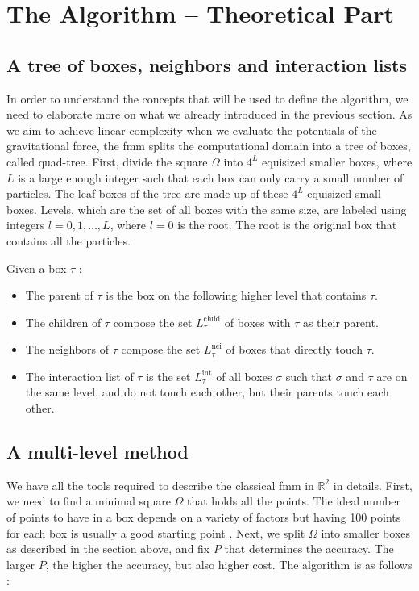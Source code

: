 \section{The Algorithm -- Theoretical Part} \label{algorithm-theory}

\subsection{A tree of boxes, neighbors and interaction lists}

In order to understand the concepts that will be used to define the algorithm, we need to elaborate more on what we already introduced in the previous section.
As we aim to achieve linear complexity when we evaluate the potentials of the gravitational force, the \gls{fmm} splits the computational domain into a tree of boxes, called quad-tree.
First, divide the square $\Omega$ into $4^L$ equisized smaller boxes, where $L$ is a large enough integer such that each box can only carry a small number of particles.
The leaf boxes of the tree are made up of these $4^L$ equisized small boxes.
Levels, which are the set of all boxes with the same size, are labeled using integers $l = 0, 1, \dots, L$, where $l=0$ is the root.
The root is the original box that contains all the particles.

Given a box $\tau$ \cite{Martinsson2015}:
\begin{itemize}
  \item The parent of $\tau$ is the box on the following higher level that contains $\tau$.
  \item The children of $\tau$ compose the set $L_{\tau}^\text{child}$ of boxes with $\tau$ as their parent.
  \item The neighbors of $\tau$ compose the set $L_{\tau}^\text{nei}$ of boxes that directly touch $\tau$.
  \item The interaction list of $\tau$ is the set $L_{\tau}^\text{int}$ of all boxes $\sigma$ such that $\sigma$ and $\tau$ are on the same level, and do not touch each other, but their parents touch each other.
\end{itemize}

\subsection{A multi-level method}

We have all the tools required to describe the classical \gls{fmm} in $\mathbb{R}^2$ in details.
First, we need to find a minimal square $\Omega$ that holds all the points.
The ideal number of points to have in a box depends on a variety of factors but having 100 points for each box is usually a good starting point \cite{Martinsson2015}.
Next, we split $\Omega$ into smaller boxes as described in the section above, and fix $P$ that determines the accuracy.
The larger $P$, the higher the accuracy, but also higher cost.
The algorithm is as follows \cite{Martinsson2015}:

